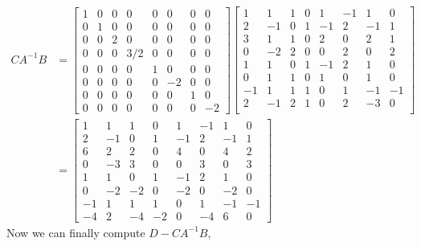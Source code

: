 \documentclass{report}
\begin{document}
$$
\begin{aligned}
CA^{-1}B & = \begin{bmatrix}
1&0&0&0&0&0&0&0\\
0&1&0&0&0&0&0&0\\
0&0&2&0&0&0&0&0\\
0&0&0&3/2&0&0&0&0\\
0&0&0&0&1&0&0&0\\
0&0&0&0&0&-2&0&0\\
0&0&0&0&0&0&1&0\\
0&0&0&0&0&0&0&-2
\end{bmatrix}
\begin{bmatrix}
1&1&1&0&1&-1&1&0\\
2&-1&0&1&-1&2&-1&1\\
3&1&1&0&2&0&2&1\\
0&-2&2&0&0&2&0&2\\
1&1&0&1&-1&2&1&0\\
0&1&1&0&1&0&1&0\\
-1&1&1&1&0&1&-1&-1\\
2&-1&2&1&0&2&-3&0\\
\end{bmatrix} \\
& =
\begin{bmatrix}
1&1&1&0&1&-1&1&0\\
2&-1&0&1&-1&2&-1&1\\
6&2&2&0&4&0&4&2\\
0&-3&3&0&0&3&0&3\\
1&1&0&1&-1&2&1&0\\
0&-2&-2&0&-2&0&-2&0\\
-1&1&1&1&0&1&-1&-1\\
-4&2&-4&-2&0&-4&6&0
\end{bmatrix}
\end{aligned}
$$
Now we can finally compute $D - CA^{-1}B$, 
\end{document}
